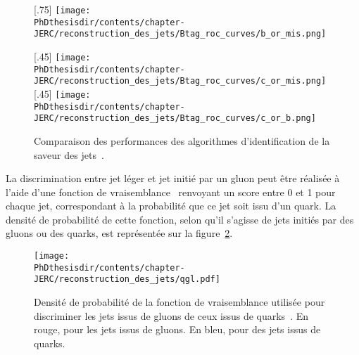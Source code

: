 \begin{figure}[h]
\centering

[.75\textwidth]
{\texttt{[image: \\PhDthesisdir/contents/chapter-JERC/reconstruction\_des\_jets/Btag\_roc\_curves/b\_or\_mis.png]}}

\vspace{\baselineskip}

[.45\textwidth]
{\texttt{[image: \\PhDthesisdir/contents/chapter-JERC/reconstruction\_des\_jets/Btag\_roc\_curves/c\_or\_mis.png]}}
\hfill
{}[.45\textwidth]
{\texttt{[image: \\PhDthesisdir/contents/chapter-JERC/reconstruction\_des\_jets/Btag\_roc\_curves/c\_or\_b.png]}}

\caption{Comparaison des performances des algorithmes d'identification de la saveur des jets~\cite{Sirunyan_heavy_flavor_jets_2018}.}
\label{fig-chapter-JERC-section-jets_reco-subsec-flavor-bc_tag_roc_curves}
\end{figure}
\par La discrimination entre jet léger et jet initié par un gluon peut être réalisée à l'aide d'une fonction de vraisemblance~\cite{CMS-PAS-JME-13-002} renvoyant un score entre 0 et 1 pour chaque jet, correspondant à la probabilité que ce jet soit issu d'un quark. La densité de probabilité de cette fonction, selon qu'il s'agisse de jets initiés par des gluons ou des quarks, est représentée sur la figure~\ref{fig-chapter-JERC-section-jets_reco-subsec-flavor-qgl_likelihood}.
\begin{figure}[h]
\centering
\texttt{[image: \\PhDthesisdir/contents/chapter-JERC/reconstruction\_des\_jets/qgl.pdf]}
\caption{Densité de probabilité de la fonction de vraisemblance utilisée pour discriminer les jets issus de gluons de ceux issus de quarks~\cite{CMS-PAS-JME-13-002}. En rouge, pour les jets issus de gluons. En bleu, pour des jets issus de quarks.}
\label{fig-chapter-JERC-section-jets_reco-subsec-flavor-qgl_likelihood}
\end{figure}
